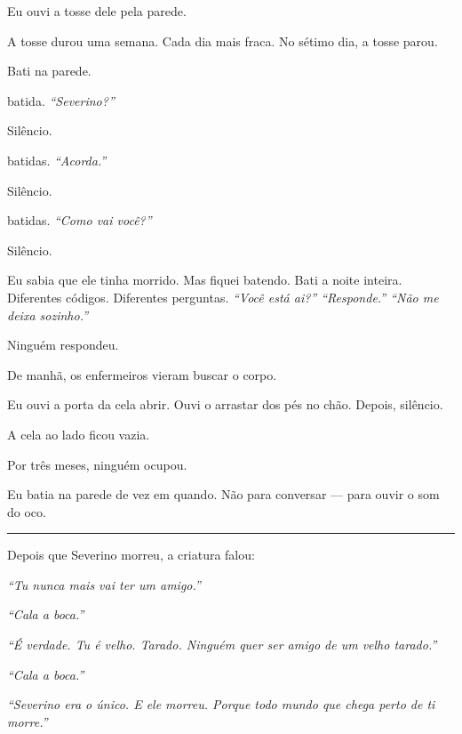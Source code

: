 \noindent Eu ouvi a tosse dele pela parede.

\noindent A tosse durou uma semana. Cada dia mais fraca. No sétimo dia, a tosse parou.

\noindent Bati na parede.

 batida. \textit{\textquotedblleft{}Severino?\textquotedblright{}}

\noindent Silêncio.

 batidas. \textit{\textquotedblleft{}Acorda.\textquotedblright{}}

\noindent Silêncio.

 batidas. \textit{\textquotedblleft{}Como vai você?\textquotedblright{}}

\noindent Silêncio.

\noindent Eu sabia que ele tinha morrido. Mas fiquei batendo. Bati a noite inteira. Diferentes códigos. Diferentes perguntas. \textit{\textquotedblleft{}Você está ai?\textquotedblright{}\textit{ }\textquotedblleft{}Responde.\textquotedblright{}\textit{ }\textquotedblleft{}Não me deixa sozinho.\textquotedblright{}}

\noindent Ninguém respondeu.

\noindent De manhã, os enfermeiros vieram buscar o corpo.

\noindent Eu ouvi a porta da cela abrir. Ouvi o arrastar dos pés no chão. Depois, silêncio.

\noindent A cela ao lado ficou vazia.

\noindent Por três meses, ninguém ocupou.

\noindent Eu batia na parede de vez em quando. Não para conversar --- para ouvir o som do oco.

\vspace{0.5em}\noindent\rule{\textwidth}{0.5pt}\vspace{0.5em}

\noindent Depois que Severino morreu, a criatura falou:

\noindent \textit{\textquotedblleft{}Tu nunca mais vai ter um amigo.\textquotedblright{}}

\noindent \textit{\textquotedblleft{}Cala a boca.\textquotedblright{}}

\noindent \textit{\textquotedblleft{}É verdade. Tu é velho. Tarado. Ninguém quer ser amigo de um velho tarado.\textquotedblright{}}

\noindent \textit{\textquotedblleft{}Cala a boca.\textquotedblright{}}

\noindent \textit{\textquotedblleft{}Severino era o único. E ele morreu. Porque todo mundo que chega perto de ti morre.\textquotedblright{}}

